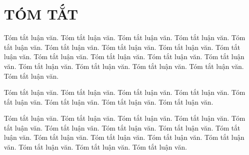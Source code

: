 \chapter*{TÓM TẮT}
Tóm tắt luận văn. Tóm tắt luận văn. Tóm tắt luận văn. Tóm tắt luận văn. Tóm tắt luận văn. Tóm tắt luận văn. Tóm tắt luận văn. Tóm tắt luận văn. Tóm tắt luận văn. Tóm tắt luận văn. Tóm tắt luận văn. Tóm tắt luận văn. Tóm tắt luận văn. Tóm tắt luận văn. Tóm tắt luận văn. Tóm tắt luận văn. Tóm tắt luận văn. Tóm tắt luận văn. 

Tóm tắt luận văn. Tóm tắt luận văn. Tóm tắt luận văn. Tóm tắt luận văn. Tóm tắt luận văn. Tóm tắt luận văn. Tóm tắt luận văn. Tóm tắt luận văn. 

Tóm tắt luận văn. Tóm tắt luận văn. Tóm tắt luận văn. Tóm tắt luận văn. Tóm tắt luận văn. Tóm tắt luận văn. Tóm tắt luận văn. Tóm tắt luận văn. Tóm tắt luận văn. Tóm tắt luận văn. Tóm tắt luận văn. Tóm tắt luận văn. Tóm tắt luận văn. Tóm tắt luận văn. Tóm tắt luận văn. Tóm tắt luận văn. 
